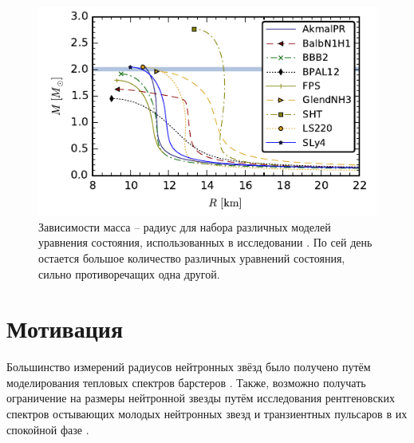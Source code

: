 \documentclass[14pt,a4paper]{extarticle}
\begin{document}
			\begin{figure}[H]
				\centering
				\includegraphics[scale=1.7]{Ch15EOS}
				\caption{\small
				Зависимости масса -- радиус для набора различных моделей уравнения состояния, использованных в исследовании \cite{Chirenti2015}.
				По сей день остается большое количество различных уравнений состояния, сильно противоречащих одна другой.}
				\label{Ch15EOS}
			\end{figure}


			

	\newpage

	\section{Мотивация}\label{Motivation}
		Большинство измерений радиусов нейтронных звёзд было получено путём моделирования тепловых спектров барстеров \cite{Miller2016}.
		Также, возможно получать ограничение на размеры нейтронной звезды путём исследования рентгеновских спектров остывающих молодых нейтронных звезд и транзиентных пульсаров в их спокойной фазе \cite{Heinke2013}.  
\end{document}
